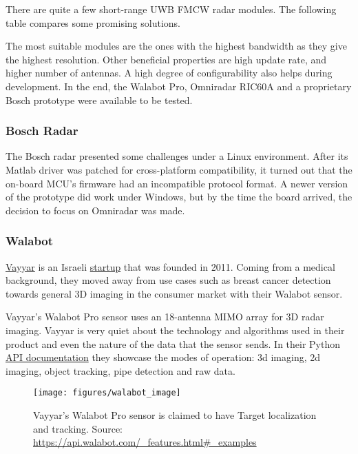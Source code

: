 There are quite a few short-range UWB FMCW radar modules. The following
table compares some promising solutions.



The most suitable modules are the ones with the highest bandwidth as
they give the highest resolution. Other beneficial properties are high
update rate, and higher number of antennas. A high degree of
configurability also helps during development. In the end, the Walabot
Pro, Omniradar RIC60A and a proprietary Bosch prototype were available
to be tested.

\subsubsection{Bosch Radar}\label{bosch-radar}

The Bosch radar presented some challenges under a Linux environment.
After its Matlab driver was patched for cross-platform compatibility, it
turned out that the on-board MCU's firmware had an incompatible protocol
format. A newer version of the prototype did work under Windows, but by
the time the board arrived, the decision to focus on Omniradar was made.

\subsubsection{Walabot}\label{walabot}

\href{https://www.vayyar.com/}{Vayyar} is an Israeli
\href{https://www.crunchbase.com/organization/vayyar}{startup} that was
founded in 2011. Coming from a medical background, they moved away from
use cases such as breast cancer detection towards general 3D imaging in
the consumer market with their Walabot sensor.

Vayyar's Walabot Pro sensor uses an 18-antenna MIMO array for 3D radar
imaging. Vayyar is very quiet about the technology and algorithms used
in their product and even the nature of the data that the sensor sends.
In their Python \href{https://api.walabot.com}{API documentation} they
showcase the modes of operation: 3d imaging, 2d imaging, object
tracking, pipe detection and raw data.

\begin{figure}[htp]
    \centering
    \label{fig:walabot_image}
    \texttt{[image: figures/walabot\_image]}
    \caption{Vayyar's Walabot Pro sensor is claimed to have Target localization and tracking. Source: \url{https://api.walabot.com/\_features.html\#\_examples}}
\end{figure}

